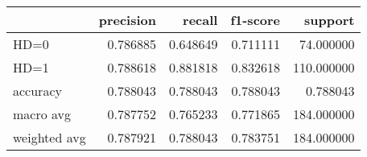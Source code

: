 \begin{tabular}{lrrrr}
\toprule
{} &  precision &    recall &  f1-score &     support \\
\midrule
HD=0         &   0.786885 &  0.648649 &  0.711111 &   74.000000 \\
HD=1         &   0.788618 &  0.881818 &  0.832618 &  110.000000 \\
accuracy     &   0.788043 &  0.788043 &  0.788043 &    0.788043 \\
macro avg    &   0.787752 &  0.765233 &  0.771865 &  184.000000 \\
weighted avg &   0.787921 &  0.788043 &  0.783751 &  184.000000 \\
\bottomrule
\end{tabular}
